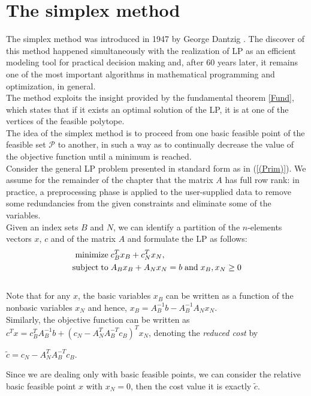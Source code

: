\documentclass[a4paper,10 pt,titlepage,twoside]{book}
\theoremstyle{plain}
\theoremstyle{definition}
\theoremstyle{remark}
\begin{document}
\chapter{The simplex method}
The simplex method was introduced in 1947 by George Dantzig \cite{DAN1}. The discover of this method happened simultaneously with the realization of LP as an efficient modeling tool for practical decision making and, after 60 years later, it remains one of the most important algorithms in mathematical programming and
optimization, in general.\\
The method exploits the insight provided by the fundamental theorem
\ref{Fund}, which states that if it exists an optimal solution of the LP, it is at one of the vertices of the feasible polytope. \\
The idea of the simplex method is to proceed from one basic feasible point of the feasible set $\mathcal{P}$ to another, in such a way as to continually decrease the value of the objective
function until a minimum is reached.\\ Consider the general LP problem presented in standard form as in (\ref{(Prim)}).
We assume for the remainder of the chapter that the matrix $A$ has full row rank: in practice, a preprocessing phase is applied to the user-supplied data to remove some
redundancies from the given constraints and eliminate some of the variables.\\Given an index sets $B$ and $N$, we can identify a partition of the $n$-elements vectors $x$, $c$ and of the matrix $A$ and formulate the LP as follows:
\begin{equation}
\begin{split}
\text{minimize\;} &c^{T}_{B}x_{B}+c^{T}_{N}x_{N},\\
\text{subject\;to\;}&A_{B}x_{B}+A_{N}x_{N} = b\text{\;and\;}x_{B}, x_{N}\geq0
\end{split}
\end{equation}
 \\Note that for any $x$, the basic variables $x_{B}$ can be written as a function of the nonbasic variables $x_{N}$ and hence, $x_{B}=A_{B}^{-1}b-A_{B}^{-1}A_{N}x_{N}$. \\Similarly, the objective function can be written as $c^{T}x=c_{B}^{T}A_{B}^{-1}b+(c_{N}-A_{N}^{T}A_{B}^{-T}c_{B})^{T}x_{N}$, denoting the \textit{reduced cost} by \begin{center}
 	$\widetilde{c}=c_{N}-A_{N}^{T}A_{B}^{-T}c_{B}$.
 \end{center}Since we are dealing only with basic feasible points, we can consider the relative basic feasible point $x$ with $x_{N}= 0$, then the cost value it is exactly $\widetilde{c}$.\\
\end{document}
